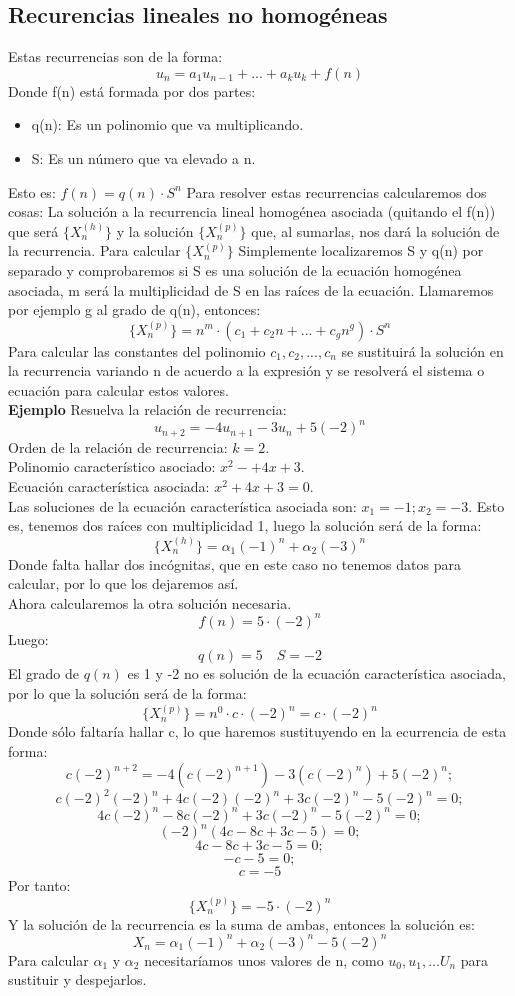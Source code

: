 \documentclass[a4paper]{article}
\begin{document}
\subsection{Recurencias lineales no homogéneas}
Estas recurrencias son de la forma:
$$u_n=a_1u_{n-1}+...+a_ku_k+f(n)$$
Donde f(n) está formada por dos partes:
\begin{itemize}
\item q(n): Es un polinomio que va multiplicando.
\item S: Es un número que va elevado a n.
\end{itemize}
Esto es: $f(n)=q(n)\cdot S^n$
Para resolver estas recurrencias calcularemos dos cosas: La solución a la recurrencia lineal homogénea asociada (quitando el f(n)) que será $\{X_n^{(h)}\}$ y la solución $\{X_n^{(p)}\}$ que, al sumarlas, nos dará la solución de la recurrencia.
Para calcular $\{X_n^{(p)}\}$ Simplemente localizaremos S y q(n) por separado y comprobaremos si S es una solución de la ecuación homogénea asociada, m será la multiplicidad de S en las raíces de la ecuación. Llamaremos por ejemplo g al grado de q(n), entonces:
$$\{X_n^{(p)}\}=n^m\cdot (c_1+c_2n+...+c_gn^g)\cdot S^n$$
Para calcular las constantes del polinomio $c_1,c_2,...,c_n$ se sustituirá la solución en la recurrencia variando n de acuerdo a la expresión y se resolverá el sistema o ecuación para calcular estos valores.\\
\large{\textbf{Ejemplo}}
Resuelva la relación de recurrencia:
$$u_{n+2}=-4u_{n+1}-3u_n+5(-2)^n$$
Orden de la relación de recurrencia: $k=2$.\\
Polinomio característico asociado: $x^2-+4x+3$.\\
Ecuación característica asociada: $x^2+4x+3=0$.\\
Las soluciones de la ecuación característica asociada son: $x_1= -1; x_2=-3$. Esto es, tenemos dos raíces con multiplicidad 1, luego la solución será de la forma:
$$\{X_n^{(h)}\}=\alpha_1(-1)^n+\alpha_2(-3)^n$$
Donde falta hallar dos incógnitas, que en este caso no tenemos datos para calcular, por lo que los dejaremos así.\\
Ahora calcularemos la otra solución necesaria.
$$f(n)=5\cdot (-2)^n$$
Luego:
$$q(n)= 5 \quad S=-2$$
El grado de $q(n)$ es 1 y -2 no es solución de la ecuación característica asociada, por lo que la solución será de la forma:
$$\{X_n^{(p)}\}=n^0\cdot c\cdot (-2)^n=c\cdot (-2)^n$$
Donde sólo faltaría hallar c, lo que haremos sustituyendo en la ecurrencia de esta forma:
$$c(-2)^{n+2}=-4(c(-2)^{n+1})-3(c(-2)^n)+5(-2)^n;$$
$$c(-2)^2(-2)^n+4c(-2)(-2)^n+3c(-2)^n-5(-2)^n=0;$$
$$4c(-2)^n-8c(-2)^n+3c(-2)^n-5(-2)^n=0;$$
$$(-2)^n(4c-8c+3c-5)=0;$$
$$4c-8c+3c-5=0;$$
$$-c-5=0;$$
$$c=-5$$
Por tanto:
$$\{X_n^{(p)}\}=-5\cdot (-2)^n$$
Y la solución de la recurrencia es la suma de ambas, entonces la solución es:
$$X_n=\alpha_1(-1)^n+\alpha_2(-3)^n-5(-2)^n$$
Para calcular $\alpha_1$ y $\alpha_2$ necesitaríamos unos valores de n, como $u_0, u_1,\ldots U_n$ para sustituir y despejarlos.
\end{document}
